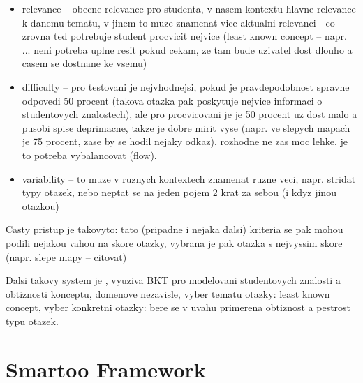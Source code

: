 \documentclass[a4paper, 12pt, twoside]{fithesis2}		%
\renewcommand{\_}{\leavevmode \kern0.07em\vbox{\hrule width0.4em}}
\newcommand{\squarebullet}{\textcolor{black}{\raisebox{0.15em}{\rule{4pt}{4pt}}}}
\newenvironment{myItemize}{
  \begin{itemize}[leftmargin=2em,rightmargin=1em,itemsep=\parskip ,parsep=0em,topsep=0em,partopsep=0em]
  \renewcommand{\labelitemi}{\squarebullet}
  \renewcommand{\labelitemii}{$\diamond$}
}{
  \end{itemize}
}
\begin{document}
\begin{myItemize}
  \item relevance -- obecne relevance pro studenta, v nasem kontextu hlavne relevance k danemu tematu, v jinem to muze znamenat vice aktualni relevanci - co zrovna ted potrebuje student procvicit nejvice (least known concept -- napr. \cite{question-gen-adapt-bayes} ... neni potreba uplne resit pokud cekam, ze tam bude uzivatel dost dlouho a casem se dostnane ke vsemu)
  \item difficulty -- pro testovani je nejvhodnejsi, pokud je pravdepodobnost spravne odpovedi 50 procent (takova otazka pak poskytuje nejvice informaci o studentovych znalostech), ale pro procvicovani je je 50 procent uz dost malo a pusobi spise deprimacne, takze je dobre mirit vyse (napr. ve slepych mapach je 75 procent, zase by se hodil nejaky odkaz), rozhodne ne zas moc lehke, je to potreba vybalancovat (flow).
  \item variability -- to muze v ruznych kontextech znamenat ruzne veci, napr. stridat typy otazek, nebo neptat se na jeden pojem 2 krat za sebou (i kdyz jinou otazkou)
\end{myItemize}

Casty pristup je takovyto: tato (pripadne i nejaka dalsi) kriteria se pak mohou podili nejakou vahou na skore otazky, vybrana je pak otazka s nejvyssim skore (napr. slepe mapy -- citovat)

Dalsi takovy system je
\cite{question-gen-adapt-bayes}, vyuziva BKT pro modelovani studentovych znalosti a obtiznosti konceptu,  domenove nezavisle, vyber tematu otazky: least known concept, vyber konkretni otazky: bere se v uvahu primerena obtiznost a pestrost typu otazek.




\chapter{Smartoo Framework}
\label{chap:smartoo}
\end{document}
